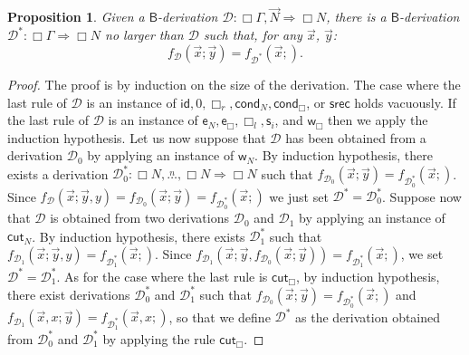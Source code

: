 \documentclass[manuscript,screen]{acmart}
\newtheorem{prop}[thm]{Proposition}
\theoremstyle{definition}
\theoremstyle{remark}
\newcommand{\n}{N}
\newcommand{\sq}{\Box}
\newcommand{\sqn}{{\sq\n}}
\newcommand{\sn}{\sqn}
\newcommand{\lists}[3]{{#2},\overset{#1}{\ldots},{#3} }
\renewcommand{\succ}[1]{\mathsf{s}_{#1}}
\newcommand{\cnd}{\mathsf{cond}}
\newcommand{\model}[1]{\denot{#1}}
\newcommand{\denot}[1]{f_{#1}}
\newcommand{\saferec}{\mathsf{srec}}
\newcommand{\srec}{\saferec}
\newcommand{\bc}{\mathsf{B}}
\newcommand{\seqar}{\Rightarrow}
\newcommand{\der}{\mathcal{D}}
\newcommand{\pder}[1]{\der_{#1}}
\newcommand{\id}{\mathsf{id}}
\newcommand{\wk}{\mathsf{w}}
\newcommand{\exch}{\mathsf{e}}
\newcommand{\cut}{\mathsf{cut}}
\newcommand{\boxlef}{\sq_l}
\newcommand{\boxrig}{\sq_r}
\newcommand{\sql}{\boxlef}
\newcommand{\sqr}{\boxrig}
\newcommand{\zero}{0}
\begin{document}
\begin{prop}\label{prop:modal-succedent-derivations}
 Given a $\bc$-derivation $\der: \sq \Gamma , \vec \n \seqar \sn$, there is a $\bc$-derivation   $\der^*:\sq\Gamma \seqar \sn$ no larger than $\der$ such that, for any $\vec x$, $\vec y$:
\begin{equation*}
 \denot\der(\vec{x}; \vec{y})= \denot{\der^*}(\vec{x};).
\end{equation*}
\end{prop} 
\begin{proof}
The proof is by induction on the size of the derivation. The case where the last rule of $\der$ is an instance of $\id, \zero, \sqr, \cnd_{\n}, \cnd_\sq$, or $\srec$ holds vacuously. If  the last rule of $\der$ is an instance of $\exch_{\n},\exch_{\sq},  \sql,\succ i$, and $\wk_\sq$ then we apply the induction hypothesis. Let us now suppose that $\der$ has been obtained from a derivation $\der_0$ by applying an instance of  $\wk_\n$. By induction hypothesis, there exists a derivation  $\pder0^*:\lists{n}{\sn}{\sn} \seqar \sn$ such that $\model{\pder0}(\vec x; \vec y)= \model{\pder0^*}(\vec x; )$. Since $\model{\der}(\vec x; \vec y, y)= \model{\pder0}(\vec x; \vec y)=\model{\pder0^*}(\vec x; )$ we just set $\der^*= \pder{0}^*$.  Suppose now that $\der$ is obtained from two derivations $\der_0$ and $\der_1$ by applying an instance of  $\cut_\n$. By induction hypothesis, there exists $\pder{1}^*$ such that $\model{\pder{1}}(\vec x;\vec y,y)=\model{\pder{1}^*}(\vec x;)$. Since 
 $\model{\pder{1}}(\vec x; \vec y,  \model{\pder{0}}(\vec x; \vec y))= \model{\pder{1}^*}(\vec x;)$, we set $\der^*=\pder{1}^*$. As for the case where the last rule is $\cut_\sq$, by induction hypothesis, there exist derivations $\pder{0}^*$ and $\pder{1}^*$ such that $\model{\pder{0}}(\vec x; \vec y)= \model{\pder{0}^*}(\vec x;)$ and $\model{\pder{1}}(\vec x,x; \vec y)= \model{\pder{1}^*}(\vec x, x;)$, so that we define $\der^*$ as the derivation obtained from $\pder{0}^*$ and $\pder{1}^*$ by applying the rule $\cut_{\sq}$.
\end{proof}

\end{document}
